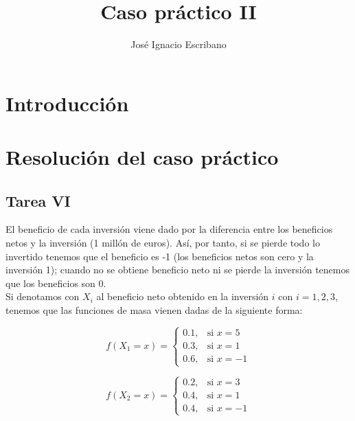 \documentclass[12pt,a4paper,twoside,openright,titlepage,final]{article}
\author{José Ignacio Escribano}
\title{Caso práctico II}
\begin{document}
\setcounter{page}{1}


\listoffigures
\thispagestyle{empty}
\newpage

\tableofcontents
\thispagestyle{empty}
\newpage


\setcounter{page}{1}

\section{Introducción}


\section{Resolución del caso práctico}



\subsection{Tarea VI}

El beneficio de cada inversión viene dado por la diferencia entre los beneficios netos y la inversión (1 millón de euros). Así, por tanto, si se pierde todo lo invertido tenemos que el beneficio es -1 (los beneficios netos son cero y la inversión 1); cuando no se obtiene beneficio neto ni se pierde la inversión tenemos que los beneficios son 0.\\

Si denotamos con $X_i$ al beneficio neto obtenido en la inversión $i$ con $i = 1,2,3$, tenemos que las funciones de masa vienen dadas de la siguiente forma:

\begin{equation*}
f(X_1 = x) = \begin{cases}
0.1, & \text{si } x = 5 \\
0.3, & \text{si } x = 1 \\
0.6, & \text{si } x = -1
\end{cases}
\end{equation*}

\begin{equation*}
f(X_2 = x) = \begin{cases}
0.2, & \text{si } x = 3 \\
0.4, & \text{si } x = 1 \\
0.4, & \text{si } x = -1
\end{cases}
\end{equation*}
\end{document}
